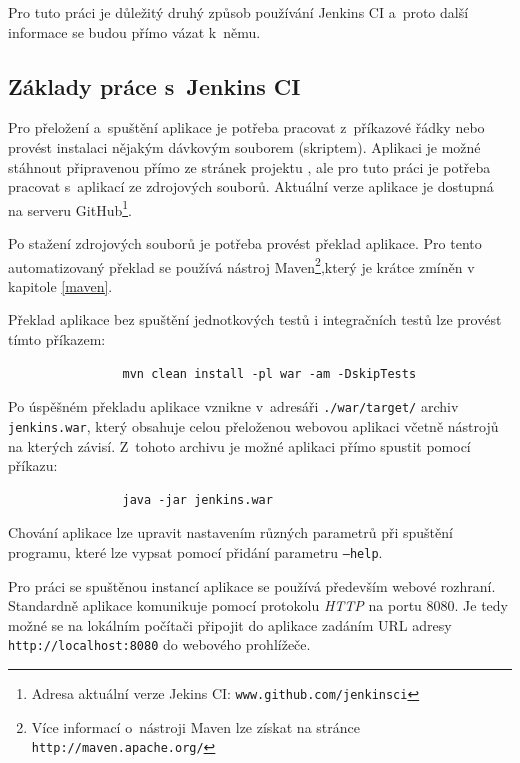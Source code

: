             Pro tuto práci je důležitý druhý způsob používání Jenkins CI a~proto další informace se budou přímo vázat k~němu.

        \subsection{Základy práce s~Jenkins CI} \label{jenkinsUsage}
            Pro přeložení a~spuštění aplikace je potřeba pracovat z~příkazové řádky nebo provést instalaci nějakým dávkovým souborem (skriptem).
            Aplikaci je možné stáhnout připravenou přímo ze stránek projektu \cite{jenkinsWeb}, ale pro tuto práci je potřeba 
            pracovat s~aplikací ze zdrojových souborů. Aktuální verze aplikace je dostupná na serveru 
            GitHub\footnote{Adresa aktuální verze Jekins CI: \texttt{www.github.com/jenkinsci}}.

            Po stažení zdrojových souborů je potřeba provést překlad aplikace. Pro tento automatizovaný 
            překlad se používá nástroj Maven\footnote{Více informací o~nástroji Maven lze získat na stránce 
            \texttt{http://maven.apache.org/}},který je krátce zmíněn v kapitole \ref{maven}. 
            
            Překlad aplikace bez spuštění jednotkových testů i integračních testů lze provést tímto příkazem:
            \begin{verbatim}
                mvn clean install -pl war -am -DskipTests
            \end{verbatim}
            
            \medskip
            Po úspěšném překladu aplikace vznikne v~adresáři \texttt{./war/target/} archiv \texttt{jenkins.war}, 
            který obsahuje celou přeloženou webovou aplikaci včetně nástrojů na 
            kterých závisí. Z~tohoto archivu je možné aplikaci přímo spustit pomocí příkazu:

            \begin{verbatim}
                java -jar jenkins.war
            \end{verbatim}
            Chování aplikace lze upravit nastavením různých parametrů při spuštění programu, 
            které lze vypsat pomocí přidání parametru \texttt{--help}.

            Pro práci se spuštěnou instancí aplikace se používá především webové rozhraní. Standardně aplikace
            komunikuje pomocí protokolu \emph{HTTP} na portu 8080. Je tedy možné se na lokálním počítači připojit do aplikace zadáním URL adresy 
            \texttt{http://localhost:8080} do webového prohlížeče. 

